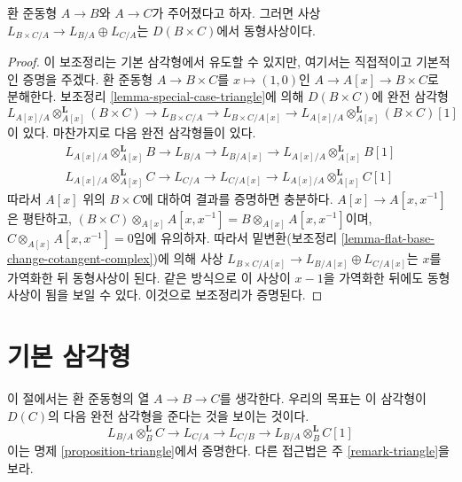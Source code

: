 \begin{lemma}
\label{lemma-cotangent-complex-product}
환 준동형 $A\to B$와 $A\to C$가 주어졌다고 하자. 그러면 사상
$L_{B\times C/A}\to L_{B/A}\oplus L_{C/A}$는 $D(B\times C)$에서
동형사상이다.
\end{lemma}

\begin{proof}
이 보조정리는 기본 삼각형에서 유도할 수 있지만, 여기서는 직접적이고
기본적인 증명을 주겠다. 환 준동형 $A\to B\times C$를
$x\mapsto(1,0)$인 $A\to A[x]\to B\times C$로 분해한다. 보조정리
\ref{lemma-special-case-triangle}에 의해 $D(B\times C)$에 완전 삼각형
$$
L_{A[x]/A} \otimes_{A[x]}^\mathbf{L} (B \times C) \to L_{B \times C/A} \to
L_{B \times C/A[x]} \to L_{A[x]/A} \otimes_{A[x]}^\mathbf{L} (B \times C)[1]
$$
이 있다. 마찬가지로 다음 완전 삼각형들이 있다.
$$
\begin{matrix}
L_{A[x]/A} \otimes_{A[x]}^\mathbf{L} B \to L_{B/A} \to L_{B/A[x]}
\to L_{A[x]/A} \otimes_{A[x]}^\mathbf{L} B[1] \\
L_{A[x]/A} \otimes_{A[x]}^\mathbf{L} C \to L_{C/A} \to L_{C/A[x]}
\to L_{A[x]/A} \otimes_{A[x]}^\mathbf{L} C[1]
\end{matrix}
$$
따라서 $A[x]$ 위의 $B\times C$에 대하여 결과를 증명하면 충분하다.
$A[x]\to A[x,x^{-1}]$은 평탄하고,
$(B\times C)\otimes_{A[x]}A[x,x^{-1}]
=B\otimes_{A[x]}A[x,x^{-1}]$이며,
$C\otimes_{A[x]}A[x,x^{-1}]=0$임에 유의하자. 따라서 밑변환(보조정리
\ref{lemma-flat-base-change-cotangent-complex})에 의해 사상
$L_{B\times C/A[x]}\to L_{B/A[x]}\oplus L_{C/A[x]}$는 $x$를 가역화한
뒤 동형사상이 된다. 같은 방식으로 이 사상이 $x-1$을 가역화한 뒤에도
동형사상이 됨을 보일 수 있다. 이것으로 보조정리가 증명된다.
\end{proof}




\section{기본 삼각형}
\label{section-triangle}

\noindent
이 절에서는 환 준동형의 열 $A\to B\to C$를 생각한다. 우리의 목표는 이
삼각형이 $D(C)$의 다음 완전 삼각형을 준다는 것을 보이는 것이다.
\begin{equation}
\label{equation-triangle}
L_{B/A} \otimes_B^\mathbf{L} C \to L_{C/A} \to L_{C/B} \to
L_{B/A} \otimes_B^\mathbf{L} C[1]
\end{equation}
이는 명제 \ref{proposition-triangle}에서 증명한다. 다른 접근법은 주
\ref{remark-triangle}을 보라.

